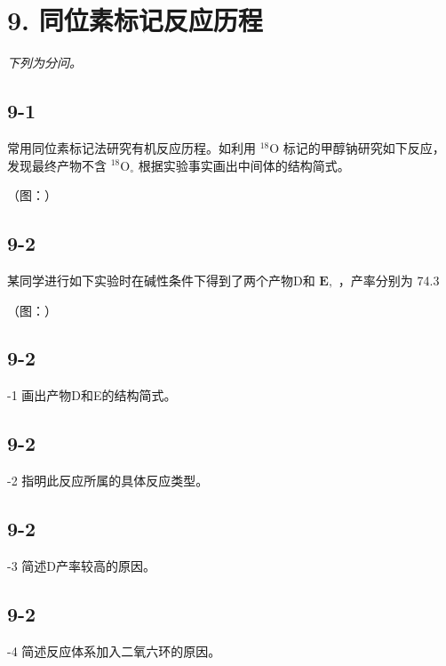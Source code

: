 \section*{9. 同位素标记反应历程}
\textit{下列为分问。}

\subsection*{9-1}
常⽤同位素标记法研究有机反应历程。如利⽤ $^ { 1 8 } \mathrm { O }$ 标记的甲醇钠研究如下反应，发现最终产物不含 $^ { 1 8 } \mathrm { O } _ { \circ }$ 根据实验事实画出中间体的结构简式。

（图：）

\subsection*{9-2}
某同学进⾏如下实验时在碱性条件下得到了两个产物D和 $\mathbf { E } ,$ ，产率分别为 74.3%

（图：）

\subsection*{9-2}
-1 画出产物D和E的结构简式。

\subsection*{9-2}
-2 指明此反应所属的具体反应类型。

\subsection*{9-2}
-3 简述D产率较⾼的原因。

\subsection*{9-2}
-4 简述反应体系加⼊⼆氧六环的原因。
